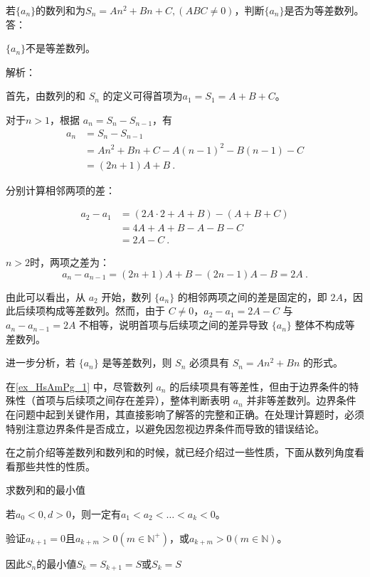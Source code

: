 \begin{example}{若$\{a_n\}$的数列和为$S_n=An^2+Bn+C,(ABC\neq0)$，判断$\{a_n\}$是否为等差数列。}\label{ex_HsAmPg_1}
答：

$\{a_n\}$不是等差数列。

解析：

首先，由数列的和 $S_n$ 的定义可得首项为$a_1=S_1=A+B+C$。

对于$n>1$，根据 $a_n = S_n - S_{n-1}$，有
\begin{equation}
\begin{split}
a_n &= S_n-S_{n-1}\\
&=An^2+Bn+C-A(n-1)^2-B(n-1)-C\\
&=(2n+1)A+B~.
\end{split}
\end{equation}

分别计算相邻两项的差：

\begin{equation}
\begin{split}
a_2 - a_1 &= (2A \cdot 2 + A + B) - (A + B + C) \\
&= 4A + A + B - A - B - C \\
&= 2A - C~.
\end{split}
\end{equation}

$n>2$时，两项之差为：
\begin{equation}
a_n-a_{n-1} = (2n+1)A+B-(2n-1)A-B=2A~.
\end{equation}

由此可以看出，从 $a_2$ 开始，数列 $\{a_n\}$ 的相邻两项之间的差是固定的，即 $2A$，因此后续项构成等差数列。然而，由于 $C \neq 0$，$a_2 - a_1 = 2A - C$ 与 $a_n - a_{n-1} = 2A$ 不相等，说明首项与后续项之间的差异导致 $\{a_n\}$ 整体不构成等差数列。

进一步分析，若 $\{a_n\}$ 是等差数列，则 $S_n$ 必须具有 $S_n = An^2 + Bn$ 的形式。
\end{example}

在\autoref{ex_HsAmPg_1} 中，尽管数列 ${a_n}$ 的后续项具有等差性，但由于边界条件的特殊性（首项与后续项之间存在差异），整体判断表明 ${a_n}$ 并非等差数列。边界条件在问题中起到关键作用，其直接影响了解答的完整和正确。在处理计算题时，必须特别注意边界条件是否成立，以避免因忽视边界条件而导致的错误结论。



在之前介绍等差数列和数列和的时候，就已经介绍过一些性质，下面从数列角度看看那些共性的性质。



求数列和的最小值

若$a_0<0,d>0$，则一定有$a_1<a_2<\dots<a_{k}<0$。

验证$a_{k+1} =0$且$a_{k+m}>0(m\in\mathbb{N}^+)$，或$a_{k+m}>0(m\in\mathbb{N})$。

因此$S_n$的最小値$S_k=S_{k+1}=S$或$S_k=S$
